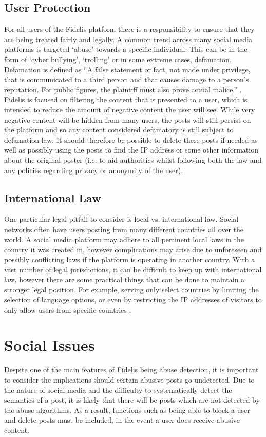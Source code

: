 \subsection{User Protection}
For all users of the Fidelis platform there is a responsibility to ensure that they are being treated fairly and legally. A common trend across many social media platforms is targeted `abuse' towards a specific individual. This can be in the form of `cyber bullying', `trolling’ or in some extreme cases, defamation. Defamation is defined as ``A false statement or fact, not made under privilege, that is communicated to a third person and that causes damage to a person’s reputation. For public figures, the plaintiff must also prove actual malice.'' \cite{BusinessLawToday}. Fidelis is focused on filtering the content that is presented to a user, which is intended to reduce the amount of negative content the user will see. While very negative content will be hidden from many users, the posts will still persist on the platform and so any content considered defamatory is still subject to defamation law. It should therefore be possible to delete these posts if needed as well as possibly using the posts to find the IP address or some other information about the original poster (i.e. to aid authorities whilst following both the law and any policies regarding privacy or anonymity of the user).

\subsection{International Law}
One particular legal pitfall to consider is local vs. international law. Social networks often have users posting from many different countries all over the world. A social media platform may adhere to all pertinent local laws in the country it was created in, however complications may arise due to unforeseen and possibly conflicting laws if the platform is operating in another country. With a vast number of legal jurisdictions, it can be difficult to keep up with international law, however there are some practical things that can be done to maintain a stronger legal position. For example, serving only select countries by limiting the selection of language options, or even by restricting the IP addresses of visitors to only allow users from specific countries \cite{Olswang}.

\section{Social Issues}
Despite one of the main features of Fidelis being abuse detection, it is important to consider the implications should certain abusive posts go undetected. Due to the nature of social media and the difficulty to systematically detect the semantics of a post, it is likely that there will be posts which are not detected by the abuse algorithms. As a result, functions such as being able to block a user and delete posts must be included, in the event a user does receive abusive content.

